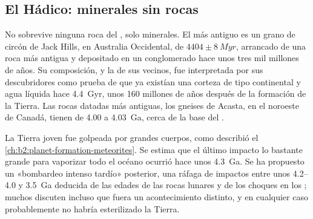 \begin{omfigure}
\par{}
\end{omfigure}

\subsection*{El Hádico: minerales sin rocas}

No sobrevive ninguna roca del , solo minerales. El más antiguo es un grano de circón de Jack
Hills, en Australia Occidental, de $4404 \pm \qty{8}{Myr}$, arrancado de una roca más antigua y depositado
en un conglomerado hace unos tres mil millones de años. Su composición, y la de sus
vecinos, fue interpretada por sus descubridores como prueba de que ya existían una corteza de tipo continental y
agua líquida hace \qty{4.4}{Gyr}, unos 160 millones de años después de la formación de la
Tierra. Las rocas datadas más antiguas, los gneises de Acasta, en el noroeste de Canadá, tienen de 4.00 a
\qty{4.03}{Ga}, cerca de la base del .

La Tierra joven fue golpeada por grandes cuerpos, como describió el \cref{ch:b2:planet-formation-meteorites}.
Se estima que el último impacto lo bastante grande para vaporizar
todo el océano ocurrió hace unos \qty{4.3}{Ga}. Se ha propuesto un «bombardeo intenso
tardío» posterior, una ráfaga de impactos entre unos 4.2--4.0 y \qty{3.5}{Ga} deducida de las
edades de las rocas lunares y de los choques en los ; muchos discuten incluso que fuera un
acontecimiento distinto, y en cualquier caso probablemente no habría esterilizado la Tierra.


